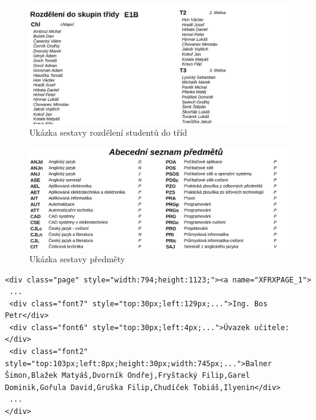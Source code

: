 \begin{figure}[H]
    \centering
    \includegraphics[width=1\linewidth]{Figures/skupiny-ukazka.png}
    \caption{Ukázka sestavy rozdělení studentů do tříd}
    \label{fig:ukazka-sestavy-tridy}
\newpage

\end{figure}
\begin{figure}[H]

    \centering
    \includegraphics[width=1\linewidth]{Figures/predmety-ukazka.png}
    \caption{Ukázka sestavy předměty}
    \label{fig:ukazka-sestavy-predmety}
    
\end{figure}

\begin{code}[H]
  \begin{verbatim}
<div class="page" style="width:794;height:1123;"><a name="XFRXPAGE_1">
 ...
 <div class="font7" style="top:30px;left:129px;...">Ing. Bos Petr</div>
 <div class="font6" style="top:30px;left:4px;...">Úvazek učitele:</div>
 <div class="font2" style="top:103px;left:8px;height:30px;width:745px;...">Balner Šimon,Blažek Matyáš,Dvorník Ondřej,Fryštacký Filip,Garel Dominik,Gořula David,Gruška Filip,Chudíček Tobiáš,Ilyenin</div>
 ...
</div>
\end{verbatim}
\caption{Zkrácené zdrojový kód HTML sestavy úvazky učitele}
\end{code}


